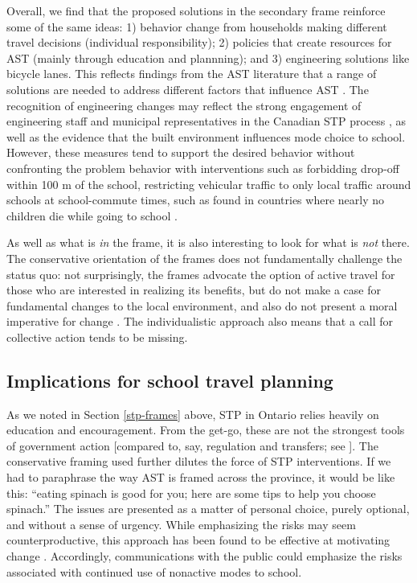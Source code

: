\documentclass[preprint, 3p,
authoryear]{elsarticle} %
\begin{document}
Overall, we find that the proposed solutions in the secondary frame
reinforce some of the same ideas: 1) behavior change from households
making different travel decisions (individual responsibility); 2)
policies that create resources for AST (mainly through education and
plannning); and 3) engineering solutions like bicycle lanes. This
reflects findings from the AST literature that a range of solutions are
needed to address different factors that influence AST
\citep[\emph{inter alia,
see}][]{mitraIndependentMobilityMode2013, panterAttitudesSocialSupport2010}.
The recognition of engineering changes may reflect the strong engagement
of engineering staff and municipal representatives in the Canadian STP
process
\citep{buttazzoniSupportingActiveSchool2018, mammenPuttingSchoolTravel2015},
as well as the evidence that the built environment influences mode
choice to school. However, these measures tend to support the desired
behavior without confronting the problem behavior with interventions
such as forbidding drop-off within 100 m of the school, restricting
vehicular traffic to only local traffic around schools at school-commute
times, such as found in countries where nearly no children die while
going to school \citep{waygood2020japan}.

As well as what is \emph{in} the frame, it is also interesting to look
for what is \emph{not} there. The conservative orientation of the frames
does not fundamentally challenge the status quo: not surprisingly, the
frames advocate the option of active travel for those who are interested
in realizing its benefits, but do not make a case for fundamental
changes to the local environment, and also do not present a moral
imperative for change \citep{severson2015moral}. The individualistic
approach also means that a call for collective action tends to be
missing.

\hypertarget{implications-for-school-travel-planning}{%
\subsection{Implications for school travel
planning}\label{implications-for-school-travel-planning}}

As we noted in Section \ref{stp-frames} above, STP in Ontario relies
heavily on education and encouragement. From the get-go, these are not
the strongest tools of government action {[}compared to, say, regulation
and transfers; see \citet{ohare1989typology}{]}. The conservative
framing used further dilutes the force of STP interventions. If we had
to paraphrase the way AST is framed across the province, it would be
like this: ``eating spinach is good for you; here are some tips to help
you choose spinach.'' The issues are presented as a matter of personal
choice, purely optional, and without a sense of urgency. While
emphasizing the risks may seem counterproductive, this approach has been
found to be effective at motivating change
\citep[e.g.,][]{lawlor2018risk, waygoodCO2ValenceFraming2018}.
Accordingly, communications with the public could emphasize the risks
associated with continued use of nonactive modes to school.
\end{document}
